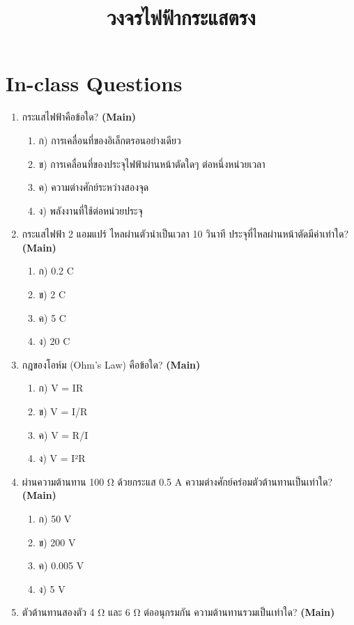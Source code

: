\documentclass[12pt]{article}
\begin{document}
\title{วงจรไฟฟ้ากระแสตรง}
\maketitle
\section*{In-class Questions}
\begin{enumerate}[label=\arabic*.]
\item กระแสไฟฟ้าคือข้อใด? \hfill \textbf{\small (Main)}
\begin{enumerate}[label=)]
\item ก) การเคลื่อนที่ของอิเล็กตรอนอย่างเดียว
\item ข) การเคลื่อนที่ของประจุไฟฟ้าผ่านหน้าตัดใดๆ ต่อหนึ่งหน่วยเวลา
\item ค) ความต่างศักย์ระหว่างสองจุด
\item ง) พลังงานที่ใช้ต่อหน่วยประจุ
\end{enumerate}
\item กระแสไฟฟ้า 2 แอมแปร์ ไหลผ่านตัวนำเป็นเวลา 10 วินาที ประจุที่ไหลผ่านหน้าตัดมีค่าเท่าใด? \hfill \textbf{\small (Main)}
\begin{enumerate}[label=)]
\item ก) 0.2 C
\item ข) 2 C
\item ค) 5 C
\item ง) 20 C
\end{enumerate}
\item กฎของโอห์ม (Ohm's Law) คือข้อใด? \hfill \textbf{\small (Main)}
\begin{enumerate}[label=)]
\item ก) V = IR
\item ข) V = I/R
\item ค) V = R/I
\item ง) V = I²R
\end{enumerate}
\item ผ่านความต้านทาน 100 Ω ด้วยกระแส 0.5 A ความต่างศักย์คร่อมตัวต้านทานเป็นเท่าใด? \hfill \textbf{\small (Main)}
\begin{enumerate}[label=)]
\item ก) 50 V
\item ข) 200 V
\item ค) 0.005 V
\item ง) 5 V
\end{enumerate}
\item ตัวต้านทานสองตัว 4 Ω และ 6 Ω ต่ออนุกรมกัน ความต้านทานรวมเป็นเท่าใด? \hfill \textbf{\small (Main)}

\end{enumerate}
\end{document}
